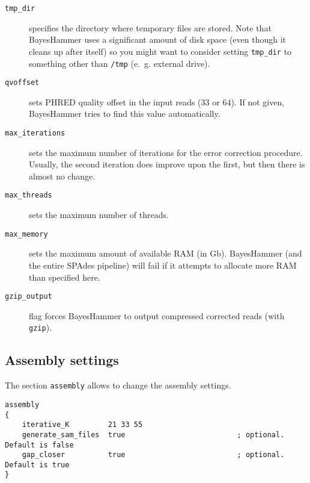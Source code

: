 \documentclass{article}
\def\spades{SPAdes}
\def\bh{BayesHammer}
\begin{document}
\begin{description}
\item[{\tt tmp\_dir}] specifies the directory where temporary files are stored. Note that {\bh} uses a significant amount of disk space (even though it
cleans up after itself) so you might want to consider setting {\tt tmp\_dir} to something other than {\tt /tmp} (e.~g. external drive).
\item[{\tt qvoffset}] sets PHRED quality offset in the input reads ($33$ or $64$). If not given, {\bh} tries to find this value automatically.
\item[{\tt max\_iterations}] sets the maximum number of iterations
for the error correction procedure. Usually, the second iteration does improve upon the first, but then there is almost no change.
\item[{\tt max\_threads}] sets the maximum number of threads.
\item[{\tt max\_memory}] sets the maximum amount of available RAM (in Gb). {\bh} (and the entire {\spades} pipeline) will fail if it attempts
to allocate more RAM than specified here.
\item[{\tt gzip\_output}] flag forces {\bh} to output compressed corrected reads (with {\tt gzip}).
\end{description}

\subsection{Assembly settings}\label{subsec:assembly}
The section {\tt assembly} allows to change the assembly settings. 

\begin{lstlisting}
assembly
{
    iterative_K         21 33 55
    generate_sam_files  true                          ; optional. Default is false
    gap_closer          true                          ; optional. Default is true
}
\end{lstlisting}
\end{document}
